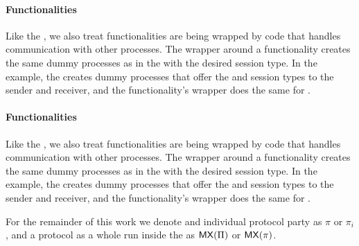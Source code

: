 \paragraph{Functionalities}
Like the \partywrapper, we also treat functionalities are being wrapped by code that handles communication with other processes. The wrapper around a functionality creates the same dummy processes as in the \partywrapper with the desired session type.
In the \Fcom example, the \partywrapper creates dummy processes that offer the  and  session types to the sender and receiver, and the functionality's wrapper does the same for \Fcom. 

\paragraph{Functionalities}
Like the \partywrapper, we also treat functionalities are being wrapped by code that handles communication with other processes. The wrapper around a functionality creates the same dummy processes as in the \partywrapper with the desired session type.
In the \Fcom example, the \partywrapper creates dummy processes that offer the  and  session types to the sender and receiver, and the functionality's wrapper does the same for \Fcom. 

For the remainder of this work we denote and individual protocol party as $\pi$ or $\pi_i$, and a protocol as a whole run inside the \partywrapper as $\mathsf{MX}(\Pi)$ or $\mathsf{MX}(\pi)$.

